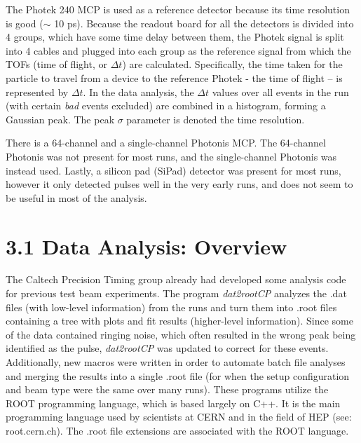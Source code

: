 \documentclass[12pt]{article}
\begin{document}
The Photek 240 MCP is used as a reference detector because its time resolution is good ($\sim$ 10 ps). 
Because the readout board for all the detectors is divided into 4 groups, which have some time delay between them, the Photek signal is split into 4 cables and plugged into each group as the reference signal from which the TOFs (time of flight, or $\Delta t$) are calculated. 
Specifically, the time taken for the particle to travel from a device to the reference Photek - the time of flight – is represented by $\Delta t$. 
In the data analysis, the $\Delta t$ values over all events in the run (with certain \textit{bad} events excluded) are combined in a histogram, forming a Gaussian peak. 
The peak $\sigma$ parameter is denoted the time resolution.

There is a 64-channel and a single-channel Photonis MCP. 
The 64-channel Photonis was not present for most runs, and the single-channel Photonis was instead used. 
Lastly, a silicon pad (SiPad) detector was present for most runs, however it only detected pulses well in the very early runs, and does not seem to be useful in most of the analysis.

\section*{3.1 Data Analysis: Overview}
The Caltech Precision Timing group already had developed some analysis code for previous test beam experiments. 
The program \textit{dat2rootCP} analyzes the .dat files (with low-level information) from the runs and turn them into .root files containing a tree with plots and fit results (higher-level information). 
Since some of the data contained ringing noise, which often resulted in the wrong peak being identified as the pulse, \textit{dat2rootCP} was updated to correct for these events. 
Additionally, new macros were written in order to automate batch file analyses and merging the results into a single .root file (for when the setup configuration and beam type were the same over many runs). 
These programs utilize the ROOT programming language, which is based largely on C++. 
It is the main programming language used by scientists at CERN and in the field of HEP (see: root.cern.ch).  
The .root file extensions are associated with the ROOT language.
\end{document}
